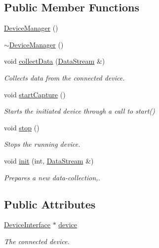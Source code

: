 \subsection*{Public Member Functions}
\begin{DoxyCompactItemize}
\item 
\hyperlink{classDeviceManager_a4e6d37b581df235b46c5696e6c71ae79}{Device\+Manager} ()
\item 
\hyperlink{classDeviceManager_ad91a247c8acfd51c533be52313ce7ddd}{$\sim$\+Device\+Manager} ()
\item 
void \hyperlink{classDeviceManager_a322e3bd6b6f57692116b6af7b9a57a9a}{collect\+Data} (\hyperlink{classDataStream}{Data\+Stream} \&)
\begin{DoxyCompactList}\small\item\em Collects data from the connected device. \end{DoxyCompactList}\item 
void \hyperlink{classDeviceManager_a30358705658f1037ef6bb98e7a2d5e80}{start\+Capture} ()
\begin{DoxyCompactList}\small\item\em Starts the initiated device through a call to start() \end{DoxyCompactList}\item 
void \hyperlink{classDeviceManager_a8569742b2eb08d95052506e372b6bd31}{stop} ()
\begin{DoxyCompactList}\small\item\em Stops the running device. \end{DoxyCompactList}\item 
void \hyperlink{classDeviceManager_a280116304655de3a0bbfbf49730f9384}{init} (int, \hyperlink{classDataStream}{Data\+Stream} \&)
\begin{DoxyCompactList}\small\item\em Prepares a new data-\/collection,. \end{DoxyCompactList}\end{DoxyCompactItemize}
\subsection*{Public Attributes}
\begin{DoxyCompactItemize}
\item 
\hyperlink{classDeviceInterface}{Device\+Interface} $\ast$ \hyperlink{classDeviceManager_aa916ac4224ab9a874e6242c0a9f50a56}{device}
\begin{DoxyCompactList}\small\item\em The connected device. \end{DoxyCompactList}\end{DoxyCompactItemize}



